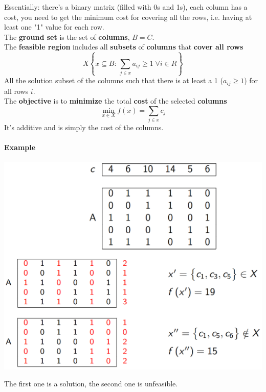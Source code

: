 \documentclass[11pt]{article}
\begin{document}
	Essentially: there's a binary matrix (filled with 0s and 1s), each column has a cost, you need to get the minimum cost for covering all the rows, i.e. having at least one "1" value for each row.\\
	
	The \textbf{ground set} is the set of \textbf{columns}, $B = C$.\\
	
	The \textbf{feasible region} includes all \textbf{subsets} of \textbf{columns} that \textbf{cover all rows}
	$$ X \left\{ x \subseteq B : \, \sum_{j \in x} a_{ij} \geq 1 \; \forall i \in R \right\}$$
	All the solution subset of the columns such that there is at least a 1 ($a_{ij} \geq 1$) for all rows $i$.\\
	
	The \textbf{objective} is to \textbf{minimize} the total \textbf{cost} of the selected \textbf{columns}
	$$ \min_{x \in X} f(x) = \sum_{j \in x} c_j$$
	It's additive and is simply the cost of the columns.\\
	
	\newpage
	
	\paragraph{Example}
	\begin{center}
		\includegraphics[width=\columnwidth]{img/SCP1}
	\end{center}
	The first one is a solution, the second one is unfeasible.\\
	
\end{document}
